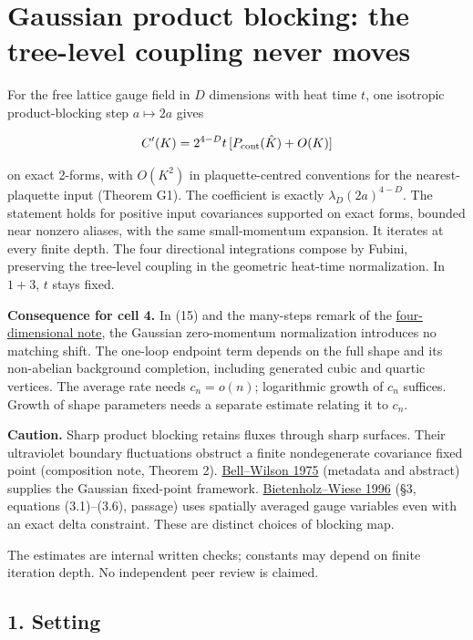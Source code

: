 \documentclass[11pt,a4paper]{article}
\begin{document}
\hypertarget{gaussian-product-blocking-the-tree-level-coupling-never-moves}{%
\section{Gaussian product blocking: the tree-level coupling never
moves}\label{gaussian-product-blocking-the-tree-level-coupling-never-moves}}

For the free lattice gauge field in \(D\) dimensions with heat time
\(t\), one isotropic product-blocking step \(a\mapsto2a\) gives

\[C'(K)=2^{4-D}t\,[P_{\rm cont}(\hat K)+O(K)]\]

on exact 2-forms, with \(O(K^2)\) in plaquette-centred conventions for
the nearest-plaquette input (Theorem G1). The coefficient is exactly
\(\lambda_D(2a)^{4-D}\). The statement holds for positive input
covariances supported on exact forms, bounded near nonzero aliases, with
the same small-momentum expansion. It iterates at every finite depth.
The four directional integrations compose by Fubini, preserving the
tree-level coupling in the geometric heat-time normalization. In
\(1+3\), \(t\) stays fixed.

\textbf{Consequence for cell 4.} In (15) and the many-steps remark of
the \href{four-dimensional-parallel-log.md}{four-dimensional note}, the
Gaussian zero-momentum normalization introduces no matching shift. The
one-loop endpoint term depends on the full shape and its non-abelian
background completion, including generated cubic and quartic vertices.
The average rate needs \(c_n=o(n)\); logarithmic growth of \(c_n\)
suffices. Growth of shape parameters needs a separate estimate relating
it to \(c_n\).

\textbf{Caution.} Sharp product blocking retains fluxes through sharp
surfaces. Their ultraviolet boundary fluctuations obstruct a finite
nondegenerate covariance fixed point (composition note, Theorem 2).
\href{https://doi.org/10.1103/PhysRevB.11.3431}{Bell--Wilson 1975}
(metadata and abstract) supplies the Gaussian fixed-point framework.
\href{https://doi.org/10.1016/0550-3213(95)00678-8}{Bietenholz--Wiese
1996} (§3, equations (3.1)--(3.6), passage) uses spatially averaged
gauge variables even with an exact delta constraint. These are distinct
choices of blocking map.

The estimates are internal written checks; constants may depend on
finite iteration depth. No independent peer review is claimed.

\hypertarget{setting}{%
\subsection{1. Setting}\label{setting}}
\end{document}
